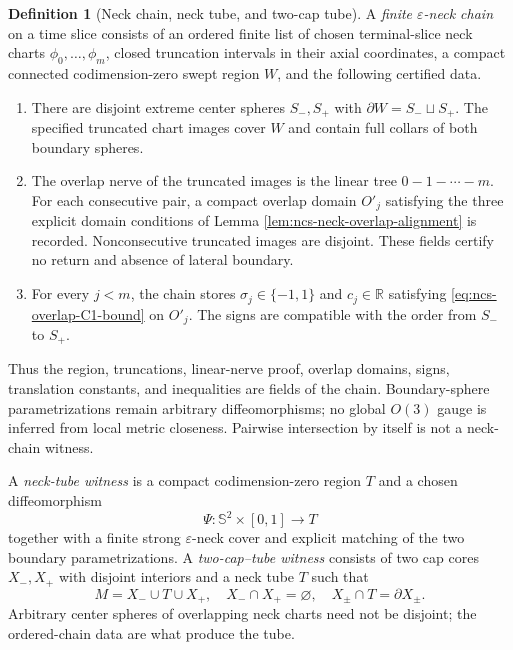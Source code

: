 \documentclass[10pt]{coll-l}
\newcommand{\R}{\mathbb{R}}
\newcommand{\Sph}{\mathbb{S}}
\theoremstyle{definition}
\newtheorem{definition}[theorem]{Definition}
\theoremstyle{remark}
\numberwithin{section}{chapter}
\numberwithin{equation}{chapter}
\begin{document}
\begin{definition}[Neck chain, neck tube, and two-cap tube]
\label{def:ncs-neck-chain}
A \emph{finite $\varepsilon$-neck chain} on a time slice consists of an
ordered finite list of chosen terminal-slice neck charts
$\phi_0,\ldots,\phi_m$, closed truncation intervals in their axial
coordinates, a compact connected codimension-zero swept region $W$, and
the following certified data.
\begin{enumerate}
\item There are disjoint extreme center spheres $S_-,S_+$ with
      $\partial W=S_-\sqcup S_+$.  The specified truncated chart images
      cover $W$ and contain full collars of both boundary spheres.
\item The overlap nerve of the truncated images is the linear tree
      $0-1-\cdots-m$.  For each consecutive pair, a compact overlap domain
      $O'_j$ satisfying the three explicit domain conditions of Lemma
      \ref{lem:ncs-neck-overlap-alignment} is recorded.  Nonconsecutive
      truncated images are disjoint.  These fields certify no return and
      absence of lateral boundary.
\item For every $j<m$, the chain stores
      $\sigma_j\in\{-1,1\}$ and $c_j\in\R$ satisfying
      \eqref{eq:ncs-overlap-C1-bound} on $O'_j$.  The signs are compatible
      with the order from $S_-$ to $S_+$.
\end{enumerate}
Thus the region, truncations, linear-nerve proof, overlap domains, signs,
translation constants, and inequalities are fields of the chain.
Boundary-sphere parametrizations remain arbitrary diffeomorphisms; no
global $O(3)$ gauge is inferred from local metric closeness.  Pairwise
intersection by itself is not a neck-chain witness.

A \emph{neck-tube witness} is a compact codimension-zero region $T$ and a
chosen diffeomorphism
\begin{equation}
                 \Psi:\Sph^2\times[0,1]\longrightarrow T              \label{eq:ncs-neck-tube-map}
\end{equation}
together with a finite strong $\varepsilon$-neck cover and explicit
matching of the two boundary parametrizations.  A \emph{two-cap--tube
witness} consists of two cap cores $X_-,X_+$ with disjoint interiors and a
neck tube $T$ such that
\begin{equation}
 M=X_-\cup T\cup X_+,\quad
 X_-\cap X_+=\varnothing,\quad
 X_\pm\cap T=\partial X_\pm.                           \label{eq:ncs-two-cap-union}
\end{equation}
Arbitrary center spheres of overlapping neck charts need not be disjoint;
the ordered-chain data are what produce the tube.
\end{definition}
\end{document}
